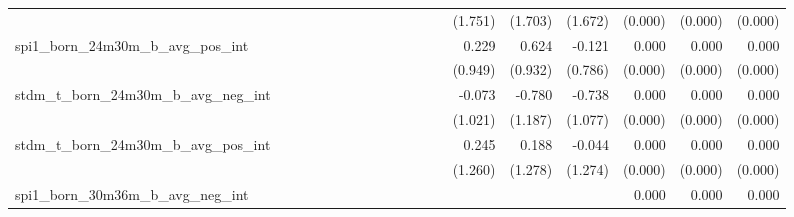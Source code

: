 \begin{tabular}{lrrrrrrrrrrrrrrrrrr}
                                            &              &              &              &              &              &              &              &              &               &              &              &               &      (1.751) &      (1.703) &       (1.672) &      (0.000) &      (0.000) &       (0.000) \\ 
spi1\_born\_24m30m\_b\_avg\_pos\_int        &              &              &              &              &              &              &              &              &               &              &              &               &        0.229 &        0.624 &        -0.121 &        0.000 &        0.000 &         0.000 \\ 
                                            &              &              &              &              &              &              &              &              &               &              &              &               &      (0.949) &      (0.932) &       (0.786) &      (0.000) &      (0.000) &       (0.000) \\ 
stdm\_t\_born\_24m30m\_b\_avg\_neg\_int     &              &              &              &              &              &              &              &              &               &              &              &               &       -0.073 &       -0.780 &        -0.738 &        0.000 &        0.000 &         0.000 \\ 
                                            &              &              &              &              &              &              &              &              &               &              &              &               &      (1.021) &      (1.187) &       (1.077) &      (0.000) &      (0.000) &       (0.000) \\ 
stdm\_t\_born\_24m30m\_b\_avg\_pos\_int     &              &              &              &              &              &              &              &              &               &              &              &               &        0.245 &        0.188 &        -0.044 &        0.000 &        0.000 &         0.000 \\ 
                                            &              &              &              &              &              &              &              &              &               &              &              &               &      (1.260) &      (1.278) &       (1.274) &      (0.000) &      (0.000) &       (0.000) \\ 
spi1\_born\_30m36m\_b\_avg\_neg\_int        &              &              &              &              &              &              &              &              &               &              &              &               &              &              &               &        0.000 &        0.000 &         0.000 \\ 

\end{tabular}
